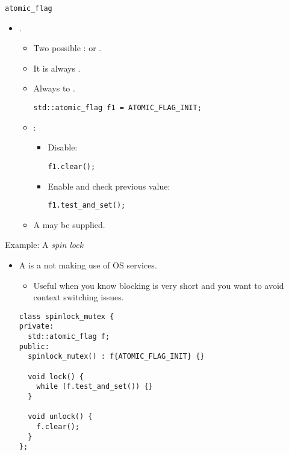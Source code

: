 \begin{frame}[t,fragile]{\texttt{atomic\_flag}}
\begin{itemize}
  \item {} .
    \begin{itemize}
      \item Two possible : 
             or .

      \item It is always .

      \item Always  to .
\begin{lstlisting}
std::atomic_flag f1 = ATOMIC_FLAG_INIT;
\end{lstlisting}

      \item {}:
        \begin{itemize}
          \item Disable: 
\begin{lstlisting}
f1.clear();
\end{lstlisting}

          \item Enable and check previous value: 
\begin{lstlisting}
f1.test_and_set();
\end{lstlisting}
        \end{itemize}

      \item A  may be supplied.
    \end{itemize}
\end{itemize}
\end{frame}

\begin{frame}[t,fragile]{Example: A \emph{spin lock}}
\begin{itemize}
  \item A  is a  
        not making use of OS services.
    \begin{itemize}
      \item Useful when you know blocking is very short and you want to avoid
            context switching issues.
    \end{itemize}
\begin{lstlisting}
class spinlock_mutex {
private:
  std::atomic_flag f;
public:
  spinlock_mutex() : f{ATOMIC_FLAG_INIT} {}

  void lock() {
    while (f.test_and_set()) {}
  }

  void unlock() {
    f.clear();
  }
};
\end{lstlisting}
\end{itemize}
\end{frame}

